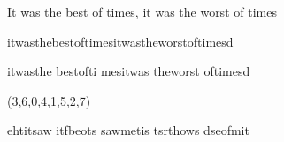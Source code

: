 
  It was the best of times, it was the worst of times
  
  itwasthebestoftimesitwastheworstoftimesd

  itwasthe bestofti mesitwas theworst oftimesd

  (3,6,0,4,1,5,2,7)

  ehtitsaw itfbeots sawmetis tsrthows dseofmit
    
